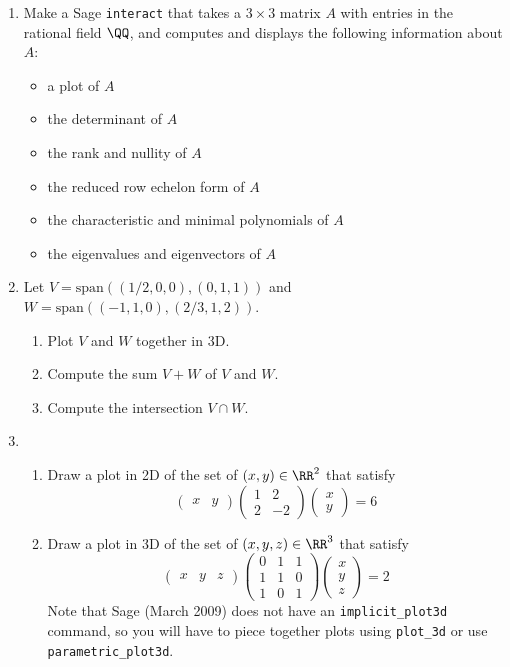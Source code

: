 \documentclass[11pt]{article}
\begin{document}
\begin{enumerate}
\item Make a Sage \texttt{interact} that takes a $3\times 3$ matrix
  $A$ with entries in the rational field $\QQ$, and computes and
  displays the following information about $A$:
\begin{itemize}
\item a plot of $A$
\item the determinant of $A$
\item the rank and nullity of $A$
\item the reduced row echelon form of $A$
\item the characteristic and minimal polynomials of $A$
\item the eigenvalues and eigenvectors of $A$
\end{itemize}


\item Let $V=\text{span}((1/2,0,0), (0,1,1))$ and 
$W=\text{span}((-1,1,0), (2/3,1,2))$.
\begin{enumerate}
\item Plot $V$ and $W$ together in 3D.
\item Compute the sum $V+W$ of $V$ and $W$.
\item Compute the intersection $V\cap W$.
\end{enumerate}

\item 
\begin{enumerate}
\item Draw a plot in 2D of the set of $(x,y)\in\RR^2$ that satisfy
$$
\left(\begin{array}{rr}
x & y
\end{array}\right) \left(\begin{array}{rr}
1 & 2 \\
2 & -2
\end{array}\right)
\left(\begin{array}{r}
x \\
y
\end{array}\right)
= 6
$$

\item Draw a plot in 3D of the set of $(x,y,z)\in\RR^3$ that satisfy
$$
\left(\begin{array}{rrr}
x & y & z
\end{array}\right)
\left(\begin{array}{rrr}
0 & 1 & 1 \\
1 & 1 & 0 \\
1 & 0 & 1
\end{array}\right)
\left(\begin{array}{r}
x \\
y \\
z
\end{array}\right)
=2
$$
Note that Sage (March 2009) does not have an \texttt{implicit\_plot3d} command, so you
will have to piece together plots using \texttt{plot\_3d} or use \texttt{parametric\_plot3d}.

\end{enumerate}

\end{enumerate}
\end{document}

